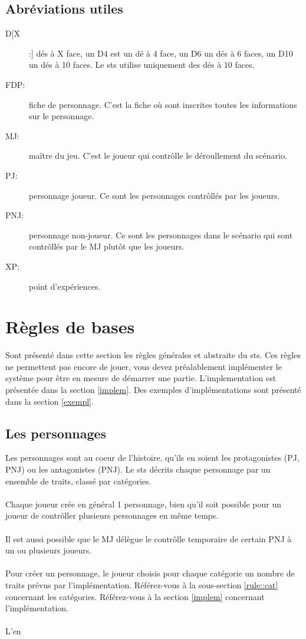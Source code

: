 \documentclass[a4paper,10pt,twoside,twocolumn]{article}
\begin{document}
 \subsection{Abréviations utiles}
 
\begin{description}
 \item[D[X]:] dés à X face, un D4 est un dé à 4 face, un D6 un dés à 6 faces, un D10 un dés à 10 faces. Le sts utilise uniquement des dés à 10 faces.
 \item[FDP:] fiche de personnage. C'est la fiche où sont inscrites toutes les informations sur le personnage.
 \item[MJ:] maître du jeu. C'est le joueur qui contrôlle le déroullement du scénario.
 \item[PJ:] personnage joueur. Ce sont les personnages contrôllés par les joueurs.
 \item[PNJ:] personnage non-joueur. Ce sont les personnages dans le scénario qui sont contrôllés par le MJ plutôt que les joueurs.
 \item[XP:] point d'expériences.
\end{description}
 
 \section{Règles de bases}
 \label{rule}
 Sont présenté dans cette section les règles générales et abstraite du sts. Ces règles ne permettent pas encore de jouer, vous devez préalablement implémenter le système pour être en mesure de démarrer une partie. L'implementation est présentée dans la section \ref{implem}. Des exemples d'implémentations sont présenté dans la section \ref{exempl}.
 
 \subsection{Les personnages}
 \label{rule::char}
  Les personnages sont au coeur de l'histoire, qu'ils en soient les protagonistes (PJ, PNJ) ou les antagonistes (PNJ). Le sts décrits chaque personnage par un ensemble de traits, classé par catégories.\\
  \\
  Chaque joueur crée en général 1 personnage, bien qu'il soit possible pour un joueur de contrôller plusieurs personnages en même temps.\\
  \\
  Il est aussi possible que le MJ délègue le contrôlle temporaire de certain PNJ à un ou plusieurs joueurs.\\
  \\
  Pour créer un personnage, le joueur choisis pour chaque catégorie un nombre de traits prévus par l'implémentation. Référez-vous à la sous-section \ref{rule::cat} concernant les catégories. Référez-vous à la section \ref{implem} concernant l'implémentation.\\
  \\
  L'en
 
\end{document}

